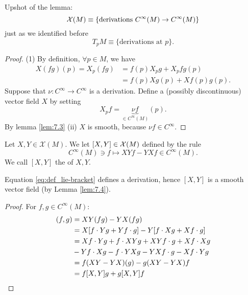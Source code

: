 Upshot of the lemma: \[\mathcal{X}(M)\equiv \{\text{derivations } C^\infty(M)\to C^\infty(M)\}\]
just as we identified before 
\[T_pM\equiv \{\text{derivations at } p\}.\]

\begin{proof}
    (1) By definition, \(\forall p\in M\), we have 
    \begin{align*}
        X(fg)(p)=X_p(fg)&=f(p)X_pg+X_pf g(p)\\
        &= f(p)Xg(p) + Xf(p)g(p).
    \end{align*}
    Suppose that \(\nu:C^\infty\to C^\infty\) is a derivation. Define a (possibly discontinuous) 
    vector field \(X\) by setting
    \[X_pf=\underbrace{\nu f}_{\in C^\infty(M)}(p).\]
    By lemma \ref{lem:7.3} (ii) \(X\) is smooth, because \(\nu f\in C^\infty\).
\end{proof}

\begin{definition*}
    Let \(X,Y\in \mathcal{X}(M)\). We let \([X,Y]\in \mathcal{X}(M)\) defined by the rule 
    \begin{equation}\label{eq:def_lie-bracket}
        C^\infty(M)\ni f\mapsto XYf-YXf \in C^\infty(M).
    \end{equation}
    We call \([X,Y]\) the  of \(X,Y\).
\end{definition*}

\begin{lemma}\label{lem:7.5}
    Equation \ref{eq:def_lie-bracket} defines a derivation, hence \([X,Y]\)
    is a smooth vector field (by Lemma \ref{lem:7.4}). 
\end{lemma}

\begin{proof}
    For \(f,g\in C^\infty(M)\):
    \begin{align*}
        [X,Y](f,g)&=XY(fg)-YX(fg) \\
        &=X[f\cdot Yg+ Yf \cdot g]- Y [f\cdot Xg + Xf\cdot g]\\
        &=Xf\cdot Yg+f\cdot XYg+ XY f\cdot g + Xf\cdot Xg\\
        & -Yf\cdot X g- f\cdot YXg-YXf \cdot g- Xf\cdot Yg\\
        &= f(XY-YX)(g)-g(XY-YX)f \\
        &= f[X,Y]g+g[X,Y]f\qedhere 
    \end{align*}
\end{proof}

